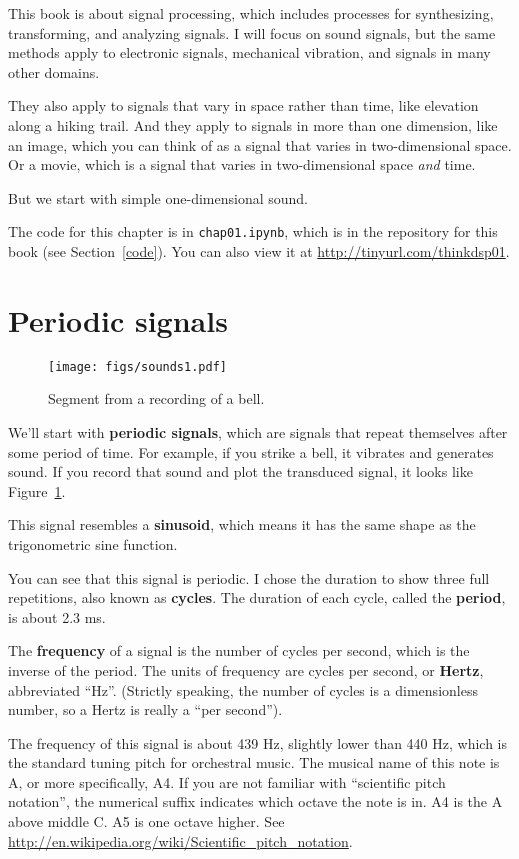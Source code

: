 \documentclass[12pt]{book} \usepackage[width=5.5in,height=8.5in, hmarginratio=3:2,vmarginratio=1:1]{geometry}
\begin{document}
This book is about signal processing, which includes processes for synthesizing, transforming, and analyzing signals. I will focus on sound signals, but the same methods apply to electronic signals, mechanical vibration, and signals in many other domains. 

They also apply to signals that vary in space rather than time, like elevation along a hiking trail. And they apply to signals in more than one dimension, like an image, which you can think of as a signal that varies in two-dimensional space. Or a movie, which is a signal that varies in two-dimensional space {\it and} time. 

But we start with simple one-dimensional sound. 

The code for this chapter is in {\tt chap01.ipynb}, which is in the repository for this book (see Section~\ref{code}). You can also view it at \url{http://tinyurl.com/thinkdsp01}. 

\section{Periodic signals} \label{violin} 

\begin{figure} 

\centerline{\texttt{[image: figs/sounds1.pdf]}} \caption{Segment from a recording of a bell.} \label{fig.sounds1} \end{figure} 

We'll start with {\bf periodic signals}, which are signals that repeat themselves after some period of time. For example, if you strike a bell, it vibrates and generates sound. If you record that sound and plot the transduced signal, it looks like Figure~\ref{fig.sounds1}. 

This signal resembles a {\bf sinusoid}, which means it has the same shape as the trigonometric sine function. 

You can see that this signal is periodic. I chose the duration to show three full repetitions, also known as {\bf cycles}. The duration of each cycle, called the {\bf period}, is about 2.3 ms. 

The {\bf frequency} of a signal is the number of cycles per second, which is the inverse of the period. The units of frequency are cycles per second, or {\bf Hertz}, abbreviated ``Hz''. (Strictly speaking, the number of cycles is a dimensionless number, so a Hertz is really a ``per second''). 

The frequency of this signal is about 439 Hz, slightly lower than 440 Hz, which is the standard tuning pitch for orchestral music. The musical name of this note is A, or more specifically, A4. If you are not familiar with ``scientific pitch notation'', the numerical suffix indicates which octave the note is in. A4 is the A above middle C. A5 is one octave higher. See \url{http://en.wikipedia.org/wiki/Scientific_pitch_notation}. 
\end{document}
